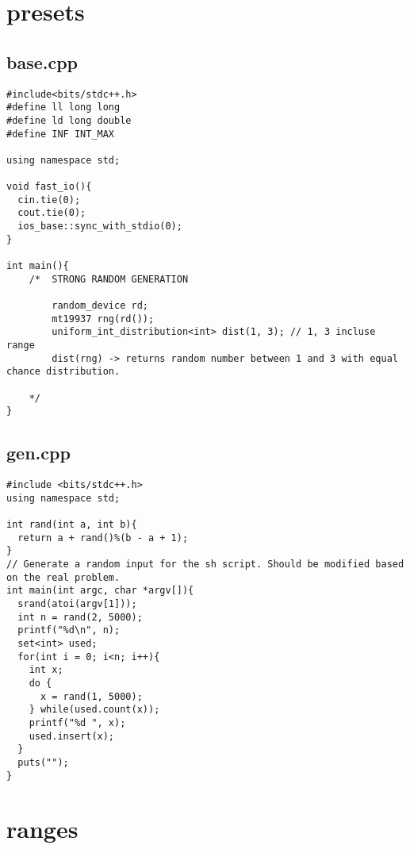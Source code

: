 \documentclass[11pt,landscape,twocolumn]{article}
\begin{document}
\section{presets}
\subsection*{base.cpp}
\begin{lstlisting}
#include<bits/stdc++.h>
#define ll long long
#define ld long double
#define INF INT_MAX

using namespace std;

void fast_io(){
  cin.tie(0);
  cout.tie(0);
  ios_base::sync_with_stdio(0);
}

int main(){
	/*	STRONG RANDOM GENERATION

		random_device rd;
		mt19937 rng(rd());
		uniform_int_distribution<int> dist(1, 3); // 1, 3 incluse range
		dist(rng) -> returns random number between 1 and 3 with equal chance distribution.

	*/
}
\end{lstlisting}

\subsection*{gen.cpp}
\begin{lstlisting}
#include <bits/stdc++.h>
using namespace std;

int rand(int a, int b){
  return a + rand()%(b - a + 1);
}
// Generate a random input for the sh script. Should be modified based on the real problem.
int main(int argc, char *argv[]){
  srand(atoi(argv[1]));
  int n = rand(2, 5000);
  printf("%d\n", n);
  set<int> used;
  for(int i = 0; i<n; i++){
    int x;
    do {
      x = rand(1, 5000);
    } while(used.count(x));
    printf("%d ", x);
    used.insert(x);
  }
  puts("");
}
\end{lstlisting}

\section{ranges}
\end{document}
